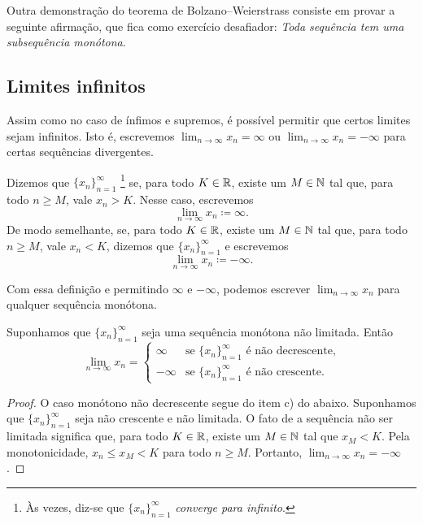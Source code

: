 Outra demonstração do teorema de Bolzano--Weierstrass consiste em provar a
seguinte afirmação,
que fica como exercício desafiador:
\emph{Toda sequência tem uma subsequência monótona}.

\subsection{Limites infinitos}

Assim como no caso de ínfimos e supremos, é possível permitir que certos
limites sejam infinitos. Isto é, escrevemos $\lim_{n\to\infty} x_n = \infty$ ou
$\lim_{n\to\infty} x_n = -\infty$ para certas sequências divergentes.

\begin{defn}
Dizemos que
$\{ x_n \}_{n=1}^\infty$ \emph{}%
\footnote{Às vezes, diz-se que $\{ x_n \}_{n=1}^\infty$ \emph{converge para infinito}.}
se, para todo $K \in
{\mathbb{R}}$, existe um $M \in {\mathbb{N}}$ tal que, para todo $n \geq M$, vale $x_n >
K$. Nesse caso, escrevemos
\begin{equation*}
\lim_{n \to \infty} x_n \coloneqq \infty .
\end{equation*}
De modo semelhante,
se, para todo $K \in {\mathbb{R}}$, existe um $M \in {\mathbb{N}}$ tal que,
para todo $n \geq M$, vale $x_n < K$, dizemos que $\{ x_n \}_{n=1}^\infty$
\emph{} e escrevemos
\begin{equation*}
\lim_{n \to \infty} x_n \coloneqq -\infty .
\end{equation*}
\end{defn}

Com essa definição e permitindo $\infty$ e $-\infty$,
podemos escrever $\lim_{n\to\infty} x_n$ para qualquer sequência monótona.

\begin{prop} \label{prop:unboundedmonotone}
Suponhamos que $\{ x_n \}_{n=1}^\infty$ seja uma sequência monótona não limitada. Então
\begin{equation*}
\lim_{n \to \infty} x_n =
\begin{cases}
\infty  & \text{se } \{ x_n \}_{n=1}^\infty \text{ é não decrescente,} \\
-\infty & \text{se } \{ x_n \}_{n=1}^\infty \text{ é não crescente.}
\end{cases}
\end{equation*}
\end{prop}

\begin{proof}
O caso monótono não decrescente segue do
item c) do  abaixo.
Suponhamos que $\{x_n\}_{n=1}^\infty$ seja não crescente e não limitada.
O fato de a sequência não ser limitada significa que,
para todo $K \in {\mathbb{R}}$, existe um $M \in {\mathbb{N}}$ tal que $x_M < K$.
Pela monotonicidade, $x_n \leq x_M < K$ para todo $n \geq M$.
Portanto, $\lim_{n\to\infty} x_n = -\infty$.
\end{proof}

